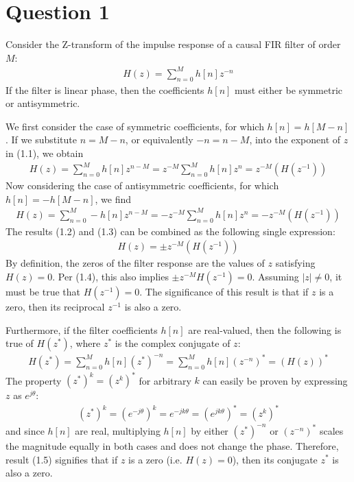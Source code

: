 \section*{Question 1}

Consider the Z-transform of the impulse response of a causal FIR filter of order $M$:
\begin{align}
    H(z) = \sum_{n=0}^{M} h[n] z^{-n}
\end{align}
If the filter is linear phase, then the coefficients $h[n]$ must either be symmetric or antisymmetric.

We first consider the case of symmetric coefficients, for which $h[n]=h[M-n]$. If we substitute $n=M-n$, or equivalently $-n=n-M$, into the exponent of $z$ in (1.1), we obtain
\begin{align}
    H(z) = \sum_{n=0}^{M} h[n] z^{n-M}
         = z^{-M} \sum_{n=0}^{M} h[n] z^n
         = z^{-M} \left(H(z^{-1})\right)
\end{align}
Now considering the case of antisymmetric coefficients, for which $h[n]=-h[M-n]$, we find
\begin{align}
    H(z) = \sum_{n=0}^{M} -h[n] z^{n-M}
         = -z^{-M} \sum_{n=0}^{M} h[n] z^n
         = -z^{-M} \left(H(z^{-1})\right)
\end{align}
The results (1.2) and (1.3) can be combined as the following single expression:
\begin{align}
    H(z) = \pm z^{-M} \left( H(z^{-1}) \right)
\end{align}
By definition, the zeros of the filter response are the values of $z$ satisfying $H(z)=0$. Per (1.4), this also implies $\pm z^{-M} H(z^{-1})=0$. Assuming $|z|\neq 0$, it must be true that $H(z^{-1})=0$. The significance of this result is that if $z$ is a zero, then its reciprocal $z^{-1}$ is also a zero.

Furthermore, if the filter coefficients $h[n]$ are real-valued, then the following is true of $H(z^*)$, where $z^*$ is the complex conjugate of $z$:
\begin{align}
    H(z^*) = \sum_{n=0}^{M} h[n] (z^*)^{-n}
           = \sum_{n=0}^{M} h[n] (z^{-n})^*
           = \left(H(z)\right)^*
\end{align}
The property $(z^*)^k=(z^k)^*$ for arbitrary $k$ can easily be proven by expressing $z$ as $e^{j\theta}$:
\begin{align*}
    (z^*)^k = (e^{-j\theta})^k = e^{-jk\theta} = (e^{jk\theta})^* = (z^k)^*
\end{align*}
and since $h[n]$ are real, multiplying $h[n]$ by either $(z^*)^{-n}$ or $(z^{-n})^*$ scales the magnitude equally in both cases and does not change the phase. Therefore, result (1.5) signifies that if $z$ is a zero (i.e. $H(z)=0$), then its conjugate $z^*$ is also a zero.

